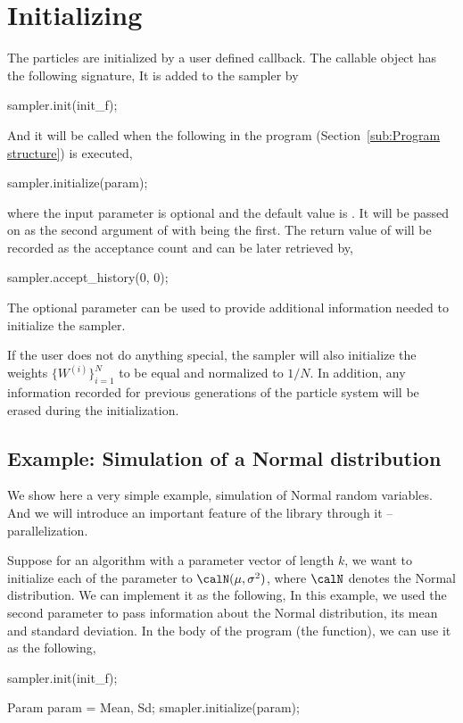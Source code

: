 \section{Initializing}
\label{sec:Initializing}

The particles are initialized by a user defined callback. The callable object
has the following signature,
It is added to the sampler by
\begin{cppcode}
sampler.init(init_f);
\end{cppcode}
And it will be called when the following in the program
(Section~\ref{sub:Program structure}) is executed,
\begin{cppcode}
sampler.initialize(param);
\end{cppcode}
where the input parameter  is optional and the default value
is . It will be passed on as the second argument of
 with  being the first. The
return value of  will be recorded as the acceptance count
and can be later retrieved by,
\begin{cppcode}
sampler.accept_history(0, 0);
\end{cppcode}
The optional parameter can be used to provide additional information needed to
initialize the sampler.

If the user does not do anything special, the sampler will also initialize the
weights $\{W^{(i)}\}_{i=1}^N$ to be equal and normalized to $1/N$. In
addition, any information recorded for previous generations of the particle
system will be erased during the initialization.

\subsection{Example: Simulation of a Normal distribution}
\label{sub:Example: Simulation of Normal distribution}

We show here a very simple example, simulation of Normal random variables.
And we will introduce an important feature of the library through it --
parallelization.

Suppose for an \smc algorithm with a parameter vector of length $k$, we want to
initialize each of the parameter to $\calN(\mu,\sigma^2)$, where $\calN$
denotes the Normal distribution. We can implement it as the following,
In this example, we used the second parameter  to pass
information about the Normal distribution, its mean and standard deviation.
In the body of the program (the  function), we can use it as
the following,
\begin{cppcode}
sampler.init(init_f);

Param param = {Mean, Sd};
smapler.initialize(param);
\end{cppcode}

